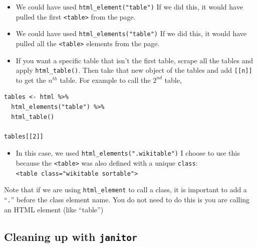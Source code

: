 \documentclass[
  letterpaper,
  DIV=11,
  numbers=noendperiod]{scrartcl}
\providecommand{\tightlist}{%
  \setlength{\itemsep}{0pt}\setlength{\parskip}{0pt}}\usepackage{longtable,booktabs,array}
\begin{document}
\begin{itemize}
\item
  We could have used \texttt{html\_element("table")} If we did this, it
  would have pulled the first \texttt{\textless{}table\textgreater{}}
  from the page.
\item
  We could have used \texttt{html\_elements("table")} If we did this, it
  would have pulled all the \texttt{\textless{}table\textgreater{}}
  elements from the page.
\item
  If you want a specific table that isn't the first table, scrape all
  the tables and apply \texttt{html\_table()}. Then take that new object
  of the tables and add \texttt{{[}{[}n{]}{]}} to get the \(n^{th}\)
  table. For example to call the \(2^{nd}\) table,
\end{itemize}

\begin{verbatim}
tables <- html %>% 
  html_elements("table") %>%
  html_table() 
  
tables[[2]]
\end{verbatim}

\begin{itemize}
\tightlist
\item
  In this case, we used \texttt{html\_elements(".wikitable")} I choose
  to use this because the \texttt{\textless{}table\textgreater{}} was
  also defined with a unique \texttt{class}:
  \texttt{\textless{}table\ class="wikitable\ sortable"\textgreater{}}
\end{itemize}

\begin{tcolorbox}[enhanced jigsaw, opacitybacktitle=0.6, coltitle=black, colframe=quarto-callout-warning-color-frame, left=2mm, breakable, opacityback=0, colbacktitle=quarto-callout-warning-color!10!white, bottomrule=.15mm, leftrule=.75mm, toptitle=1mm, bottomtitle=1mm, rightrule=.15mm, arc=.35mm, title=\textcolor{quarto-callout-warning-color}{\faExclamationTriangle}\hspace{0.5em}{Warning}, titlerule=0mm, colback=white, toprule=.15mm]

Note that if we are using \texttt{html\_element} to call a class, it is
important to add a ``\texttt{.}'' before the class element name. You do
not need to do this is you are calling an HTML element (like ``table'')

\end{tcolorbox}

\hypertarget{cleaning-up-with-janitor}{%
\subsection{\texorpdfstring{Cleaning up with
\texttt{janitor}}{Cleaning up with janitor}}\label{cleaning-up-with-janitor}}
\end{document}
